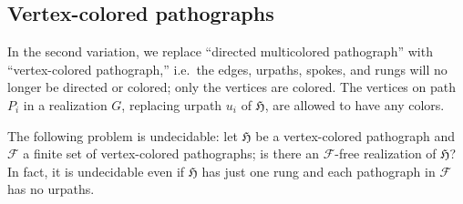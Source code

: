\documentclass{article}
\newcommand{\Fc}{\mathcal{F}}
\newcommand{\Hf}{\mathfrak{H}}
\begin{document}
\subsection{Vertex-colored pathographs}

In the second variation, we replace ``directed multicolored pathograph'' with ``vertex-colored pathograph,'' i.e.\ the edges, urpaths, spokes, and rungs will no longer be directed or colored; only the vertices are colored. The vertices on path $P_i$ in a realization $G$, replacing urpath $u_i$ of $\Hf$, are allowed to have any colors.

\begin{lemma}\label{lem:vcolor}
The following problem is undecidable: let $\Hf$ be a vertex-colored pathograph and $\Fc$ a finite set of vertex-colored pathographs; is there an $\Fc$-free realization of $\Hf$? In fact, it is undecidable even if $\Hf$ has just one rung and each pathograph in $\Fc$ has no urpaths.
\end{lemma}
\end{document}
